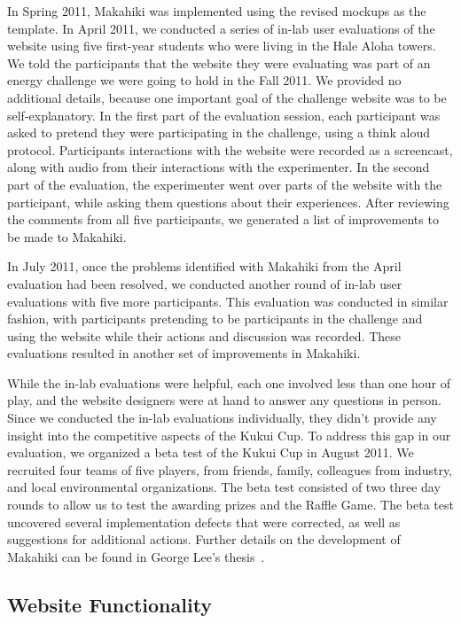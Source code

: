 In Spring 2011, Makahiki was implemented using the revised mockups as the template. In April 2011, we conducted a series of in-lab user evaluations of the website using five first-year students who were living in the Hale Aloha towers. We told the participants that the website they were evaluating was part of an energy challenge we were going to hold in the Fall 2011. We provided no additional details, because one important goal of the challenge website was to be self-explanatory. In the first part of the evaluation session, each participant was asked to pretend they were participating in the challenge, using a think aloud protocol. Participants interactions with the website were recorded as a screencast, along with audio from their interactions with the experimenter. In the second part of the evaluation, the experimenter went over parts of the website with the participant, while asking them questions about their experiences. After reviewing the comments from all five participants, we generated a list of improvements to be made to Makahiki.

In July 2011, once the problems identified with Makahiki from the April evaluation had been resolved, we conducted another round of in-lab user evaluations with five more participants. This evaluation was conducted in similar fashion, with participants pretending to be participants in the challenge and using the website while their actions and discussion was recorded. These evaluations resulted in another set of improvements in Makahiki.

While the in-lab evaluations were helpful, each one involved less than one hour of play, and the website designers were at hand to answer any questions in person. Since we conducted the in-lab evaluations individually, they didn't provide any insight into the competitive aspects of the Kukui Cup. To address this gap in our evaluation, we organized a beta test of the Kukui Cup in August 2011. We recruited four teams of five players, from friends, family, colleagues from industry, and local environmental organizations. The beta test consisted of two three day rounds to allow us to test the awarding prizes and the Raffle Game. The beta test uncovered several implementation defects that were corrected, as well as suggestions for additional actions. Further details on the development of Makahiki can be found in George Lee's thesis~\cite{csdl2-11-01}.


\subsection{Website Functionality}

